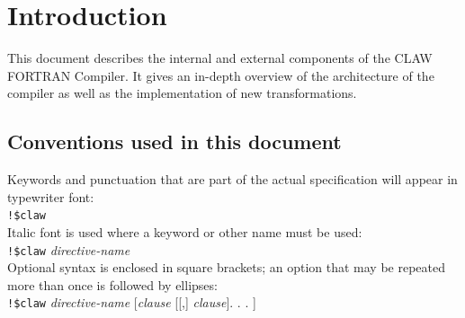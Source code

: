 \documentclass[a4paper, 11pt]{report}
\def\clawfcomp{CLAW FORTRAN Compiler\xspace}
\newcommand{\emptypage}{}
\begin{document}
\emptypage
\pagebreak
\tableofcontents

\chapter*{Introduction}
This document describes the internal and external components of the \clawfcomp.
It gives an in-depth overview of the architecture of the compiler as well as
the implementation of new transformations.

\section*{Conventions used in this document}

Keywords and punctuation that are part of the actual specification will appear
in typewriter font: \\

\lstinline|!$claw|\\

Italic font is used where a keyword or other name must be used: \\

\lstinline|!$claw| \textit{directive-name}\\

Optional syntax is enclosed in square brackets; an option that may be repeated
more than once is followed by ellipses:\\

\lstinline|!$claw| \textit{directive-name} [\textit{clause} [[,] \textit{clause}]. . . ]













\pagebreak
\glsaddall
\printglossaries

\emptypage
\pagebreak
\listoffigures

\pagebreak
\listoftables

\emptypage
\pagebreak
\lstlistoflistings





%
\end{document}
